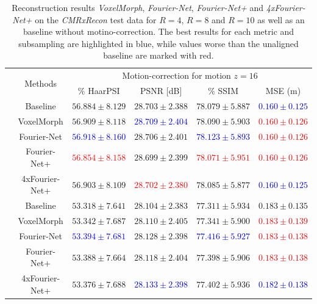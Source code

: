 \documentclass[english,version-2022-01]{uzl-thesis} %
\begin{document}
\begin{table}[h] %
	\centering
	\caption{Reconstruction results \emph{VoxelMorph}, \emph{Fourier-Net}, \emph{Fourier-Net+} and \emph{4xFourier-Net+} on the \emph{CMRxRecon} test data for $R=4$, $R=8$ and $R=10$ as well as an baseline without motino-correction. The best results for each metric and subsampling are highlighted in blue, while values worse than the unaligned baseline are marked with red.}
	\label{tab:ComparisonReconstructionCMRxRecon}
	\begin{tabular}{c c c c c c} 
		\toprule
		 & \multirow{2}{*}{Methods} & \multicolumn{4}{c}{Motion-correction for motion $z=16$} \\
		\cline{3-6} 
		 & & $\%$ HaarPSI & PSNR [dB] & $\%$ SSIM & MSE (m)\\
		
		\midrule
		\multirow{5}{*}{\rotatebox{90}{$R=4$}} & Baseline & $56.884 \pm 8.129$ & $28.703 \pm 2.388$ & $78.079 \pm 5.887$ & \textcolor{blue}{$0.160 \pm 0.125$} \\  
		 & VoxelMorph & $56.909 \pm 8.118$ & \textcolor{blue}{$28.709 \pm 2.404$} & $78.090 \pm 5.903$ & \textcolor{red}{$0.160 \pm 0.126$} \\  
		 & Fourier-Net & \textcolor{blue}{$56.918 \pm 8.160$} & $28.706 \pm 2.401$ & \textcolor{blue}{$78.123 \pm 5.893$} & \textcolor{red}{$0.160 \pm 0.126$} \\  
		 & Fourier-Net+ & \textcolor{red}{$56.854 \pm 8.158$} & $28.699 \pm 2.399$ & \textcolor{red}{$78.071 \pm 5.951$} & \textcolor{red}{$0.160 \pm 0.126$} \\   
		 & 4xFourier-Net+ & $56.903 \pm 8.109$ & \textcolor{red}{$28.702 \pm 2.380$} & $78.085 \pm 5.877$ & \textcolor{blue}{$0.160 \pm 0.125$} \\  
		
		\midrule
		\multirow{5}{*}{\rotatebox{90}{$R=8$}} & Baseline & $53.318 \pm 7.641$ & $28.104 \pm 2.383$ & $77.311 \pm 5.934$ & $0.183 \pm 0.135$ \\  
		 & VoxelMorph & $53.342 \pm 7.687$ & $28.110 \pm 2.405$ & $77.341 \pm 5.900$ & \textcolor{red}{$0.183 \pm 0.139$} \\  
		 & Fourier-Net & \textcolor{blue}{$53.394 \pm 7.681$} & $28.128 \pm 2.398$ & \textcolor{blue}{$77.416 \pm 5.927$} & \textcolor{red}{$0.183 \pm 0.138$} \\  
		 & Fourier-Net+ & $53.388 \pm 7.664$ & $28.118 \pm 2.404$ & $77.398 \pm 5.906$ & \textcolor{red}{$0.183 \pm 0.138$} \\   
		 & 4xFourier-Net+ & $53.376 \pm 7.688$ & \textcolor{blue}{$28.133 \pm 2.398$} & $77.402 \pm 5.936$ & \textcolor{blue}{$0.182 \pm 0.138$} \\ 
		 	 

\end{tabular}
\end{table}
\end{document}
